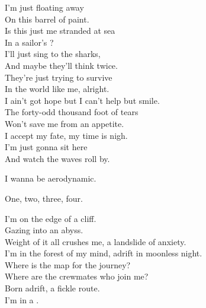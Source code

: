 
I'm just floating away \\
On this barrel of paint. \\
Is this just me stranded at sea \\
In a sailor's ? \\
I'll just sing to the sharks, \\
And maybe they'll think twice. \\

They're just trying to survive \\
In the world like me, alright. \\
I ain't got hope but I can't help but smile. \\
The forty-odd thousand foot of tears \\
Won't save me from an appetite. \\
I accept my fate, my time is nigh. \\
I'm just gonna sit here \\
And watch the waves roll by. \\


I wanna be aerodynamic. \\





One, two, three, four. \\


I'm on the edge of a cliff. \\
Gazing into an abyss. \\
Weight of it all crushes me, a landslide of anxiety. \\
I'm in the forest of my mind, adrift in moonless night. \\
Where is the map for the journey? \\
Where are the crewmates who join me? \\
Born adrift, a fickle route. \\
I'm in a . \\


